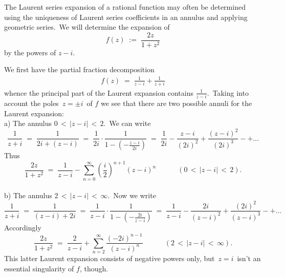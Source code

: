 \documentclass[12pt]{article}
\theoremstyle{definition}
\begin{document}
The Laurent series expansion of a rational function may often be determined using the uniqueness of Laurent series coefficients in an annulus and applying geometric series.\, We will determine the expansion of 
$$f(z) \;:=\; \frac{2z}{1\!+\!z^2}$$
by the powers of $z\!-\!i$.

We first have the partial fraction decomposition 
\begin{align}
f(z) \;=\; \frac{1}{z\!-\!i}+\frac{1}{z\!+\!i}
\end{align}
whence the principal part of the Laurent expansion contains $\displaystyle\frac{1}{z\!-\!i}$.\, Taking into account the poles\, $z = \pm i$\, of $f$ we see that there are two possible annuli for the Laurent expansion:\\

a)\; The annulus\; $\displaystyle 0 \,<\, |z\!-\!i| \,<\, 2$.\, We can write
$$
\frac{1}{z\!+\!i} \;=\; \frac{1}{2i\!+\!(z\!-\!i)} \;=\; \frac{1}{2i}\cdot\frac{1}{1\!-\!\left(-\frac{z-i}{2i}\right)}
                  \;=\; \frac{1}{2i}-\frac{z\!-\!i}{(2i)^2}+\frac{(z\!-\!i)^2}{(2i)^3}-+\ldots
$$
Thus
$$\frac{2z}{1\!+\!z^2} \;=\; \frac{1}{z\!-\!i}-\sum_{n=0}^\infty\left(\frac{i}{2}\right)^{n+1}(z\!-\!i)^n
\quad \qquad (0 \,<\, |z\!-\!i| \,<\, 2).
$$\\


b)\; The annulus\; $\displaystyle 2 \,<\, |z\!-\!i| \,<\, \infty$.\, Now we write
$$\frac{1}{z\!+\!i} \;=\; 
\frac{1}{(z\!-\!i)\!+\!2i} \;=\; \frac{1}{z\!-\!i}\cdot\frac{1}{1\!-\!\left(-\frac{2i}{z-i}\right)}
\;=\; \frac{1}{z\!-\!i}-\frac{2i}{(z\!-\!i)^2}+\frac{(2i)^2}{(z\!-\!i)^3}-+\ldots
$$
Accordingly
$$\frac{2z}{1\!+\!z^2} \;=\; \frac{2}{z\!-\!i}+\sum_{n=2}^\infty\frac{(-2i)^{n-1}}{(z\!-\!i)^n}
\quad \qquad (2 \,<\, |z\!-\!i| \,<\, \infty).
$$
This latter Laurent expansion consists of negative powers only, but\, $z = i$\, isn't an essential singularity of $f$, though.

\end{document}
